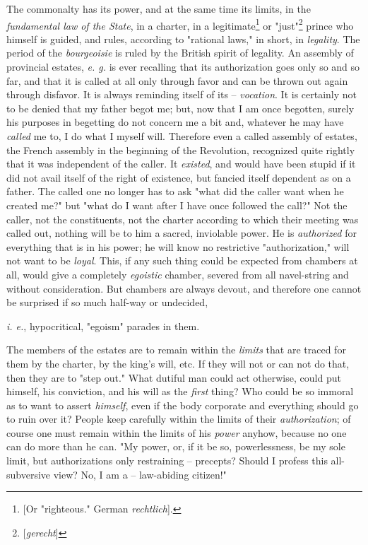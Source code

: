 \documentclass[a4paper]{book}
\begin{document}
The commonalty has its power, and at the same time its limits, in the 
\textit{fundamental law of the State}, in a charter, in a 
legitimate\footnote{[Or "{}righteous."{} German \textit{rechtlich}].} or 
"{}just"{}\footnote{[\textit{gerecht}]} prince who himself is guided, and 
rules, according to "{}rational laws,"{} in short, in \textit{legality}. The 
period of the \textit{bourgeoisie} is ruled by the British spirit of legality. 
An assembly of provincial estates, \textit{e. g.} is ever recalling that its 
authorization goes only so and so far, and that it is called at all only 
through favor and can be thrown out again through disfavor. It is always 
reminding itself of its -- \textit{vocation}. It is certainly not to be denied 
that my father begot me; but, now that I am once begotten, surely his purposes 
in begetting do not concern me a bit and, whatever he may have \textit{called} 
me to, I do what I myself will. Therefore even a called assembly of estates, 
the French assembly in the beginning of the Revolution, recognized quite 
rightly that it was independent of the caller. It \textit{existed}, and would 
have been stupid if it did not avail itself of the right of existence, but 
fancied itself dependent as on a father. The called one no longer has to ask 
"{}what did the caller want when he created me?"{} but "{}what do I want after 
I have once followed the call?"{} Not the caller, not the constituents, not 
the charter according to which their meeting was called out, nothing will be 
to him a sacred, inviolable power. He is \textit{authorized} for everything 
that is in his power; he will know no restrictive "{}authorization,"{} will 
not want to be \textit{loyal}. This, if any such thing could be expected from 
chambers at all, would give a completely \textit{egoistic} chamber, severed 
from all navel-string and without consideration. But chambers are always 
devout, and therefore one cannot be surprised if so much half-way or 
undecided,

\textit{i. e.}, hypocritical, "{}egoism"{} parades in them.

The members of the estates are to remain within the \textit{limits} that are 
traced for them by the charter, by the king's will, etc. If they will not or 
can not do that, then they are to "{}step out."{} What dutiful man could act 
otherwise, could put himself, his conviction, and his will as the 
\textit{first} thing? Who could be so immoral as to want to assert 
\textit{himself}, even if the body corporate and everything should go to ruin 
over it? People keep carefully within the limits of their 
\textit{authorization}; of course one must remain within the limits of his 
\textit{power} anyhow, because no one can do more than he can. "{}My power, 
or, if it be so, powerlessness, be my sole limit, but authorizations only 
restraining -- precepts? Should I profess this all-subversive view? No, I am a 
-- law-abiding citizen!"{}
\end{document}
